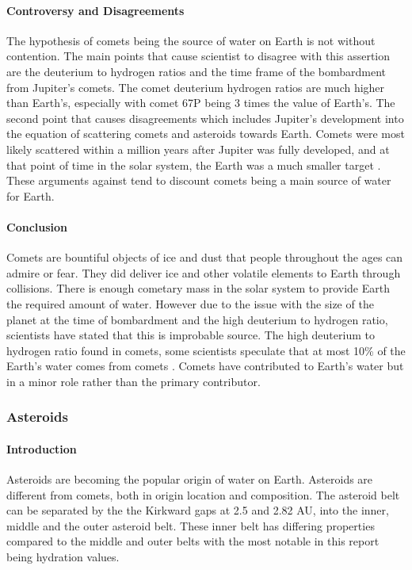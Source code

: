 \paragraph{Controversy and Disagreements}
The hypothesis of comets being the source of water on Earth is not without contention. The main points that cause scientist to disagree with this assertion are the deuterium to hydrogen ratios and the time frame of the bombardment from Jupiter's comets.
The comet deuterium hydrogen ratios are much higher than Earth's, especially with comet 67P being 3 times the value of Earth's. 
The second point that causes disagreements which includes Jupiter's development into the equation of scattering comets and asteroids towards Earth. Comets were most likely scattered within a million years after Jupiter was fully developed, and at that point of time in the solar system, the Earth was a much smaller target \cite{morbidelli2000source}. 
These arguments against tend to discount comets being a main source of water for Earth.

\newpage
\paragraph{Conclusion}
Comets are bountiful objects of ice and dust that people throughout the ages can admire or fear. They did deliver ice and other volatile elements to Earth through collisions.
There is enough cometary mass in the solar system to provide Earth the required amount of water. 
However due to the issue with the size of the planet at the time of bombardment and the high deuterium to hydrogen ratio, scientists have stated that this is improbable source.
The high deuterium to hydrogen ratio found in comets, some scientists speculate that at most 10\% of the Earth's water comes from comets \cite{morbidelli2000source}.
Comets have contributed to Earth's water but in a minor role rather than the primary contributor.

\subsubsection{Asteroids}
\paragraph{Introduction}
Asteroids are becoming the popular origin of water on Earth.
Asteroids are different from comets, both in origin location and composition.
The asteroid belt can be separated by the the Kirkward gaps at 2.5 and 2.82 AU\cite{AsteroidBelt}, into the inner, middle and the outer asteroid belt.
These inner belt has differing properties compared to the middle and outer belts with the most notable in this report being hydration values.

